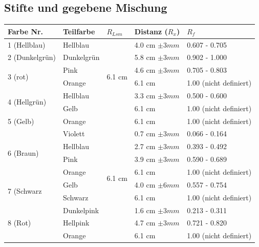 \documentclass[11pt,paper=a4,final]{scrartcl}
\begin{document}
\subsection{Stifte und gegebene Mischung}
\begin{savenotes} %
  \begin{table}[ht!]
    \centering
    \begin{tabular}{|l|l|l|l|l|}
      \hline
    \bf Farbe Nr.	& \bf Teilfarbe	& \bf \(R_{Lsm}\)		& \bf Distanz (\(R_x\))	& \bf \(R_f\)		\\ \hline
      1 (Hellblau)	& Hellblau	& \multirow{6}{*}{6.1 cm }	& 4.0 cm \(\pm 3 mm \)	& 0.607 - 0.705		\\ \cline{1-2} \cline{4-5}
      2 (Dunkelgr\"un)	& Dunkelgr\"un	&				& 5.8 cm \(\pm 3 mm \)	& 0.902 - 1.000		\\ \cline{1-2} \cline{4-5}
      \multirow{2}{*}{3 (rot) }
			& Pink		&				& 4.6 cm \(\pm 3 mm \)	& 0.705 - 0.803		\\ 
			& Orange	&				& 6.1 cm 		& 1.00 (nicht definiert)\\ \cline{1-2} \cline{4-5}
      \multirow{2}{*}{4 (Hellgr\"un) }
 			& Hellblau	&				& 3.3 cm \(\pm 3 mm \)	& 0.500 - 0.600		\\
			& Gelb		&				& 6.1 cm		& 1.00 (nicht definiert)\\ \hline
      5 (Gelb)		& Orange	& \multirow{10}{*}{6.1 cm }	& 6.1 cm		& 1.00 (nicht definiert)\\ \cline{1-2} \cline{4-5}
      \multirow{4}{*}{6 (Braun)}
			& Violett	&				& 0.7 cm \(\pm 3 mm \)	& 0.066 - 0.164		\\
			& Hellblau	&				& 2.7 cm \(\pm 3 mm \)	& 0.393 - 0.492		\\
      			& Pink		&				& 3.9 cm \(\pm 3 mm \)	& 0.590 - 0.689		\\
      			& Orange	&				& 6.1 cm 		& 1.00 (nicht definiert)\\ \cline{1-2} \cline{4-5}
      \multirow{2}{*}{7 (Schwarz}
      			& Gelb		&				& 4.0 cm \(\pm 6 mm \)	& 0.557 - 0.754		\\
      			& Schwarz	&				& 6.1 cm		& 1.00 (nicht definiert)\\ \cline{1-2} \cline{4-5}
      \multirow{3}{*}{8 (Rot)}
      			& Dunkelpink	& 				& 1.6 cm \(\pm 3 mm \)	& 0.213 - 0.311		\\ 
      			& Hellpink	&				& 4.7 cm \(\pm 3 mm \)	& 0.721 - 0.820		\\
      			& Orange	&				& 6.1 cm		& 1.00 (nicht definiert)\\ \hline

\end{tabular}
\end{table}
\end{savenotes}
\end{document}
